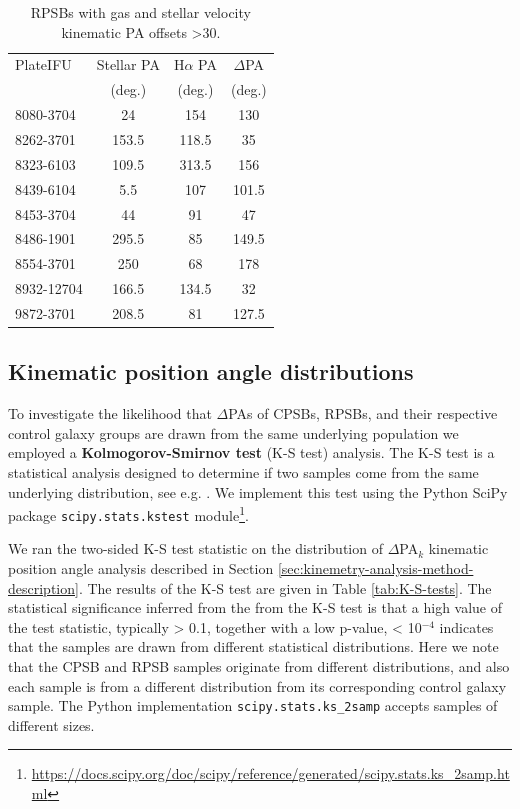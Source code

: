 \begin{table}
\centering
\caption[RPSBs with kinematic velocity PA offsets \textgreater 30\textdegree.]{RPSBs with gas and stellar velocity kinematic PA offsets \textgreater 30\textdegree.}
\label{tab:offsetRPSBs}
\begin{tabular}{lccc}
\hline
PlateIFU   & Stellar PA & H$\alpha$ PA & $\Delta$PA \\
  & (deg.) & (deg.) & (deg.) \\
\hline
8080-3704 & 24 & 154 & 130 \\
8262-3701 & 153.5 & 118.5 & 35 \\
8323-6103 & 109.5 & 313.5 & 156 \\
8439-6104 & 5.5 & 107 & 101.5 \\
8453-3704 & 44 & 91 & 47 \\
8486-1901 & 295.5 & 85 & 149.5 \\
8554-3701 & 250 & 68 & 178 \\
8932-12704 & 166.5 & 134.5 & 32 \\
9872-3701 & 208.5 & 81 & 127.5 \\
\hline
\end{tabular}
\end{table}



\subsection{Kinematic position angle distributions}
\label{sec:K-S-test}
To investigate the likelihood that $\Delta$PAs of CPSBs, RPSBs, and their respective control galaxy groups are drawn from the same underlying population we employed a \textbf{Kolmogorov-Smirnov test} (K-S test) analysis. The K-S test is a statistical analysis designed to determine if two samples come from the same underlying distribution, see e.g. \citet{hodges1958significance}. We implement this test using the Python SciPy package \texttt{scipy.stats.kstest} module\footnote{\href{https://docs.scipy.org/doc/scipy/reference/generated/scipy.stats.ks\_2samp.html}{https://docs.scipy.org/doc/scipy/reference/generated/scipy.stats.ks\_2samp.html}}.

We ran the two-sided K-S test statistic on the distribution of $\Delta$PA$_{k}$ kinematic position angle analysis described in Section \ref{sec:kinemetry-analysis-method-description}. The results of the K-S test are given in Table \ref{tab:K-S-tests}. The statistical significance inferred from the from the K-S test is that a high value of the test statistic, typically > 0.1, together with a low p-value, < 10$^{-4}$ indicates that the samples are drawn from different statistical distributions. Here we note that the CPSB and RPSB samples originate from different distributions, and also each sample is from a different distribution from its corresponding control galaxy sample. The Python implementation \texttt{scipy.stats.ks\_2samp} accepts samples of different sizes.

